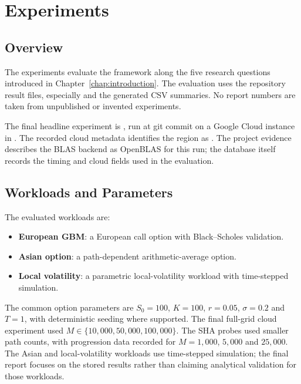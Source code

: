 \chapter{Experiments}
\label{chap:experiments}

\section{Overview}

The experiments evaluate the framework along the five research questions introduced in Chapter~\ref{chap:introduction}. The evaluation uses the repository result files, especially  and the generated CSV summaries. No report numbers are taken from unpublished or invented experiments.

The final headline experiment is , run at git commit  on a Google Cloud  instance in . The recorded cloud metadata identifies the region as . The project evidence describes the BLAS backend as OpenBLAS for this run; the database itself records the timing and cloud fields used in the evaluation.

\section{Workloads and Parameters}

The evaluated workloads are:
\begin{itemize}
    \item \textbf{European GBM}: a European call option with Black--Scholes validation.
    \item \textbf{Asian option}: a path-dependent arithmetic-average option.
    \item \textbf{Local volatility}: a parametric local-volatility workload with time-stepped simulation.
\end{itemize}

The common option parameters are \(S_0=100\), \(K=100\), \(r=0.05\), \(\sigma=0.2\) and \(T=1\), with deterministic seeding where supported. The final full-grid cloud experiment used \(M \in \{10{,}000, 50{,}000, 100{,}000\}\). The SHA probes used smaller path counts, with progression data recorded for \(M=1{,}000\), \(5{,}000\) and \(25{,}000\). The Asian and local-volatility workloads use time-stepped simulation; the final report focuses on the stored results rather than claiming analytical validation for those workloads.

